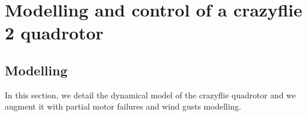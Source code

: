 \documentclass[anonymous=true,format=sigconf, screen=true, review=false]{acmart}
\begin{document}




\section{Modelling and control of a crazyflie 2 quadrotor}
\label{sec:model-control-quad}
\subsection{Modelling}
\label{sec:modelling}


In this section, we detail the dynamical model of the crazyflie quadrotor \cite{goubault_putot,quadcopter_model} and we augment it with partial motor failures and wind gusts modelling. 

\end{document}
